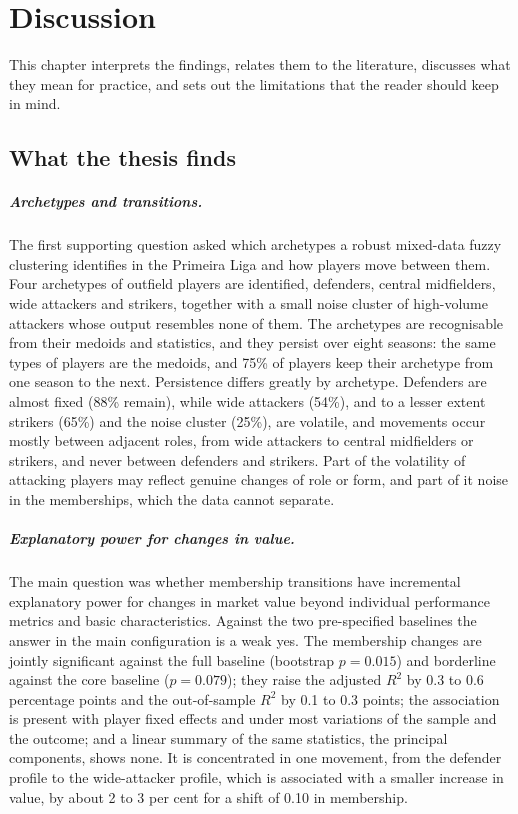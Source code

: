 \chapter{Discussion}
\label{ch:discussion}

This chapter interprets the findings, relates them to the literature, discusses what they mean for practice, and sets out the limitations that the reader should keep in mind.

\section{What the thesis finds}
\label{sec:disc-findings}

\paragraph{Archetypes and transitions.} The first supporting question asked which archetypes a robust mixed-data fuzzy clustering identifies in the Primeira Liga and how players move between them. Four archetypes of outfield players are identified, defenders, central midfielders, wide attackers and strikers, together with a small noise cluster of high-volume attackers whose output resembles none of them. The archetypes are recognisable from their medoids and statistics, and they persist over eight seasons: the same types of players are the medoids, and 75\% of players keep their archetype from one season to the next. Persistence differs greatly by archetype. Defenders are almost fixed (88\% remain), while wide attackers (54\%), and to a lesser extent strikers (65\%) and the noise cluster (25\%), are volatile, and movements occur mostly between adjacent roles, from wide attackers to central midfielders or strikers, and never between defenders and strikers. Part of the volatility of attacking players may reflect genuine changes of role or form, and part of it noise in the memberships, which the data cannot separate.

\paragraph{Explanatory power for changes in value.} The main question was whether membership transitions have incremental explanatory power for changes in market value beyond individual performance metrics and basic characteristics. Against the two pre-specified baselines the answer in the main configuration is a weak yes. The membership changes are jointly significant against the full baseline (bootstrap $p=0.015$) and borderline against the core baseline ($p=0.079$); they raise the adjusted $R^2$ by 0.3 to 0.6 percentage points and the out-of-sample $R^2$ by 0.1 to 0.3 points; the association is present with player fixed effects and under most variations of the sample and the outcome; and a linear summary of the same statistics, the principal components, shows none. It is concentrated in one movement, from the defender profile to the wide-attacker profile, which is associated with a smaller increase in value, by about 2 to 3 per cent for a shift of 0.10 in membership.

